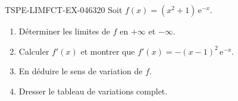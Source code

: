 \begin{exercice}{TSPE-LIMFCT-EX-046}{3}{20}
Soit $f(x) = (x^2 + 1)\,\mathrm{e}^{-x}$.
\begin{enumerate}
  \item Déterminer les limites de $f$ en $+\infty$ et $-\infty$.
  \item Calculer $f'(x)$ et montrer que $f'(x) = -(x-1)^2\,\mathrm{e}^{-x}$.
  \item En déduire le sens de variation de $f$.
  \item Dresser le tableau de variations complet.
\end{enumerate}
\end{exercice}
